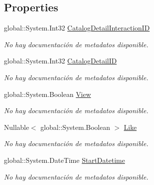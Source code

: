 \subsection*{Properties}
\begin{DoxyCompactItemize}
\item 
global\-::\-System.\-Int32 \hyperlink{class_game_memory_1_1_catalog_detail_interactions_a069a81f58e0a578f38eb9ecb69bb5a7b}{Catalog\-Detail\-Interaction\-I\-D}
\begin{DoxyCompactList}\small\item\em No hay documentación de metadatos disponible. \end{DoxyCompactList}\item 
global\-::\-System.\-Int32 \hyperlink{class_game_memory_1_1_catalog_detail_interactions_a595e63da355b8a69ec4da9038aaaee29}{Catalog\-Detail\-I\-D}
\begin{DoxyCompactList}\small\item\em No hay documentación de metadatos disponible. \end{DoxyCompactList}\item 
global\-::\-System.\-Boolean \hyperlink{class_game_memory_1_1_catalog_detail_interactions_aa1066cee4581a0ec9f0169f6336d75b8}{View}
\begin{DoxyCompactList}\small\item\em No hay documentación de metadatos disponible. \end{DoxyCompactList}\item 
Nullable$<$ global\-::\-System.\-Boolean $>$ \hyperlink{class_game_memory_1_1_catalog_detail_interactions_a4f0e09f1191b173af90719683f166595}{Like}
\begin{DoxyCompactList}\small\item\em No hay documentación de metadatos disponible. \end{DoxyCompactList}\item 
global\-::\-System.\-Date\-Time \hyperlink{class_game_memory_1_1_catalog_detail_interactions_a39bb069512ca0a6abdf9df3d0aa54cf0}{Start\-Datetime}
\begin{DoxyCompactList}\small\item\em No hay documentación de metadatos disponible. \end{DoxyCompactList}\item 

\end{DoxyCompactItemize}
